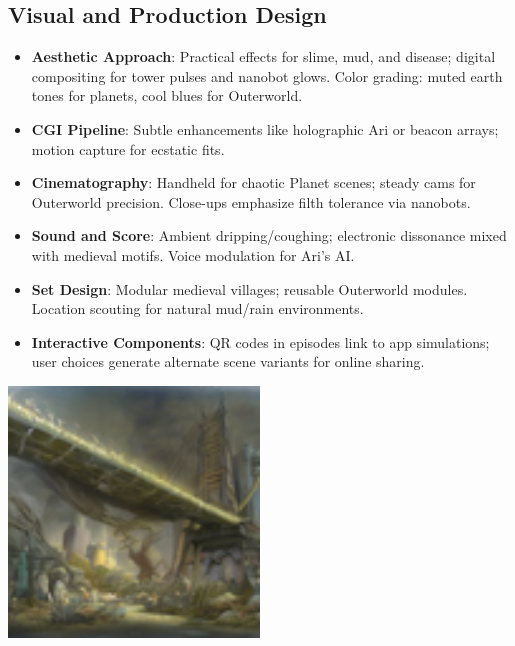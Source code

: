 \documentclass[10pt,letterpaper]{article}
\begin{document}
\subsection{Visual and Production Design}
\begin{itemize}
    \item \textbf{Aesthetic Approach}: Practical effects for slime, mud, and disease; digital compositing for tower pulses and nanobot glows. Color grading: muted earth tones for planets, cool blues for Outerworld.
    \item \textbf{CGI Pipeline}: Subtle enhancements like holographic Ari or beacon arrays; motion capture for ecstatic fits.
    \item \textbf{Cinematography}: Handheld for chaotic Planet scenes; steady cams for Outerworld precision. Close-ups emphasize filth tolerance via nanobots.
    \item \textbf{Sound and Score}: Ambient dripping/coughing; electronic dissonance mixed with medieval motifs. Voice modulation for Ari's AI.
    \item \textbf{Set Design}: Modular medieval villages; reusable Outerworld modules. Location scouting for natural mud/rain environments.
    \item \textbf{Interactive Components}: QR codes in episodes link to app simulations; user choices generate alternate scene variants for online sharing.
\end{itemize}

\begin{center}
\includegraphics[width=0.5\textwidth]{tech_image1.jpg} %
{}
\end{center}
\end{document}
